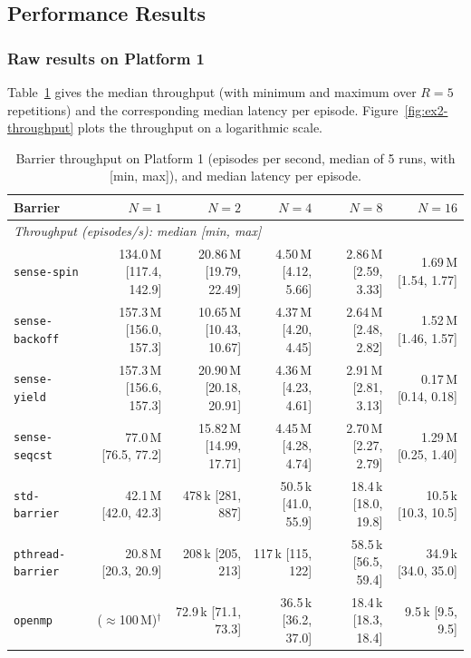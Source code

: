 \subsection{Performance Results}
\label{sec:ex2-perf}

\subsubsection{Raw results on Platform 1}

Table~\ref{tab:ex2-perf} gives the median throughput (with minimum and
maximum over $R=5$ repetitions) and the corresponding median latency per
episode. Figure~\ref{fig:ex2-throughput} plots the throughput on a
logarithmic scale.

\begin{table}[H]
\centering
\caption{Barrier throughput on Platform 1 (episodes per second, median of 5
runs, with [min, max]), and median latency per episode.}
\label{tab:ex2-perf}
\scriptsize
\setlength{\tabcolsep}{3pt}
\begin{tabular}{l r r r r r}
\toprule
\textbf{Barrier} & $N=1$ & $N=2$ & $N=4$ & $N=8$ & $N=16$ \\
\midrule
\multicolumn{6}{l}{\emph{Throughput (episodes/s): median [min, max]}} \\
\texttt{sense-spin}      & 134.0\,M [117.4, 142.9] & 20.86\,M [19.79, 22.49] & 4.50\,M [4.12, 5.66] & 2.86\,M [2.59, 3.33] & 1.69\,M [1.54, 1.77] \\
\texttt{sense-backoff}   & 157.3\,M [156.0, 157.3] & 10.65\,M [10.43, 10.67] & 4.37\,M [4.20, 4.45] & 2.64\,M [2.48, 2.82] & 1.52\,M [1.46, 1.57] \\
\texttt{sense-yield}     & 157.3\,M [156.6, 157.3] & 20.90\,M [20.18, 20.91] & 4.36\,M [4.23, 4.61] & 2.91\,M [2.81, 3.13] & 0.17\,M [0.14, 0.18] \\
\texttt{sense-seqcst}    & 77.0\,M [76.5, 77.2]    & 15.82\,M [14.99, 17.71] & 4.45\,M [4.28, 4.74] & 2.70\,M [2.27, 2.79] & 1.29\,M [0.25, 1.40] \\
\texttt{std-barrier}     & 42.1\,M [42.0, 42.3]    & 478\,k [281, 887]       & 50.5\,k [41.0, 55.9] & 18.4\,k [18.0, 19.8] & 10.5\,k [10.3, 10.5] \\
\texttt{pthread-barrier} & 20.8\,M [20.3, 20.9]    & 208\,k [205, 213]       & 117\,k [115, 122]    & 58.5\,k [56.5, 59.4] & 34.9\,k [34.0, 35.0] \\
\texttt{openmp}          & ($\approx$100\,M)$^{\dagger}$ & 72.9\,k [71.1, 73.3] & 36.5\,k [36.2, 37.0] & 18.4\,k [18.3, 18.4] & 9.5\,k [9.5, 9.5] \\

\end{tabular}
\end{table}
